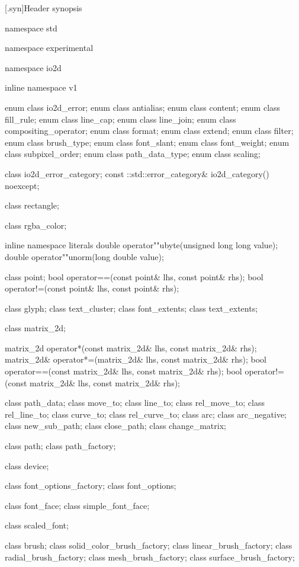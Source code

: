 [\iotwod.syn]{Header  synopsis}

%
\begin{codeblock}

namespace std { namespace experimental { namespace io2d { inline namespace v1 {
  enum class io2d_error;
  enum class antialias;
  enum class content;
  enum class fill_rule;
  enum class line_cap;
  enum class line_join;
  enum class compositing_operator;
  enum class format;
  enum class extend;
  enum class filter;
  enum class brush_type;
  enum class font_slant;
  enum class font_weight;
  enum class subpixel_order;
  enum class path_data_type;
  enum class scaling;

  class io2d_error_category;
  const ::std::error_category& io2d_category() noexcept;

  class rectangle;

  class rgba_color;

  inline namespace literals {
    double operator""ubyte(unsigned long long value);
    double operator""unorm(long double value);
  }
  
  class point;
  bool operator==(const point& lhs, const point& rhs);
  bool operator!=(const point& lhs, const point& rhs);

  class glyph;
  class text_cluster;
  class font_extents;
  class text_extents;

  class matrix_2d;

  matrix_2d operator*(const matrix_2d& lhs, const matrix_2d& rhs);
  matrix_2d& operator*=(matrix_2d& lhs, const matrix_2d& rhs);
  bool operator==(const matrix_2d& lhs, const matrix_2d& rhs);
  bool operator!=(const matrix_2d& lhs, const matrix_2d& rhs);

  class path_data;
  class move_to;
  class line_to;
  class rel_move_to;
  class rel_line_to;
  class curve_to;
  class rel_curve_to;
  class arc;
  class arc_negative;
  class new_sub_path;
  class close_path;
  class change_matrix;
  
  class path;
  class path_factory;
  
  class device;

  class font_options_factory;
  class font_options;

  class font_face;
  class simple_font_face;

  class scaled_font;

  class brush;
  class solid_color_brush_factory;
  class linear_brush_factory;
  class radial_brush_factory;
  class mesh_brush_factory;
  class surface_brush_factory;
  
}}}}
\end{codeblock}
